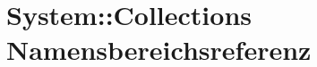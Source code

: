 \hypertarget{namespaceSystem_1_1Collections}{
\section{System::Collections Namensbereichsreferenz}
\label{namespaceSystem_1_1Collections}
}




